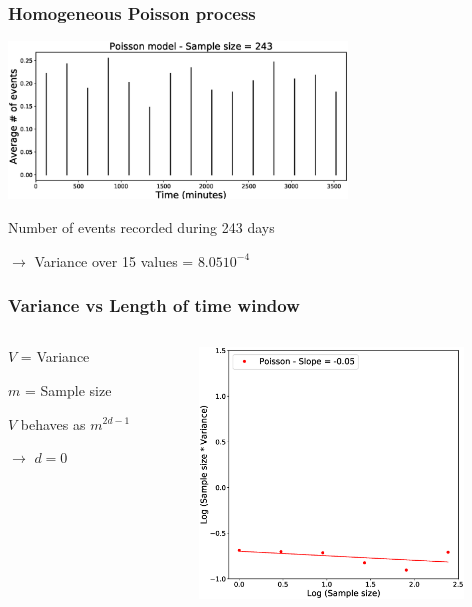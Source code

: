 \documentclass{beamer}
\begin{document}
	\begin{frame}
		\frametitle{Homogeneous Poisson process}
		\begin{center}
			\includegraphics[width=9cm, trim={1cm 0cm 3cm 0cm}, clip]{longrange/Poisson_6.eps}
		\end{center}
		Number of events recorded during 243 days

		$\rightarrow$ Variance over 15 values = $8.05 10^{-4}$
	\end{frame}

	\begin{frame}
		\frametitle{Variance vs Length of time window}
		\begin{columns}[c]
			\begin{column}{4cm}
				$V$ = Variance

				\vspace{1em}

				$m$ = Sample size

				\vspace{1em}

				$V$ behaves as $m^{2 d - 1}$

				\vspace{1em}

				$\rightarrow$ $d =  0$
			\end{column}
			\begin{column}{7cm}
				\begin{center}
					\includegraphics[width=7cm, trim={0cm 1cm 2cm 2cm}, clip]{longrange/comparison_1.eps}
				\end{center}
			\end{column}
		\end{columns}
	\end{frame}
\end{document}

